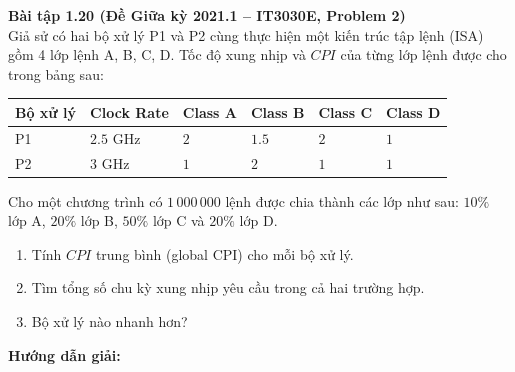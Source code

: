 \textbf{Bài tập 1.20 (Đề Giữa kỳ 2021.1 -- IT3030E, Problem 2)}\\
Giả sử có hai bộ xử lý P1 và P2 cùng thực hiện một kiến trúc tập lệnh (ISA) gồm 4 lớp lệnh A, B, C, D. Tốc độ xung nhịp và $CPI$ của từng lớp lệnh được cho trong bảng sau:
\begin{center}
\begin{tabularx}{0.85\textwidth}{|C{2cm}|C{2.5cm}|Z|Z|Z|Z|}
\hline
\textbf{Bộ xử lý} & \textbf{Clock Rate} & \textbf{Class A} & \textbf{Class B} & \textbf{Class C} & \textbf{Class D} \\ \hline
P1 & $2.5\text{ GHz}$ & $2$ & $1.5$ & $2$ & $1$ \\ \hline
P2 & $3\text{ GHz}$ & $1$ & $2$ & $1$ & $1$ \\ \hline
\end{tabularx}
\end{center}
Cho một chương trình có $1\,000\,000\text{ lệnh}$ được chia thành các lớp như sau: $10\%$ lớp A, $20\%$ lớp B, $50\%$ lớp C và $20\%$ lớp D.
\begin{enumerate}[label=\alph*)]
    \item Tính $CPI$ trung bình (global CPI) cho mỗi bộ xử lý.
    \item Tìm tổng số chu kỳ xung nhịp yêu cầu trong cả hai trường hợp.
    \item Bộ xử lý nào nhanh hơn?
\end{enumerate}
\textbf{Hướng dẫn giải:}
